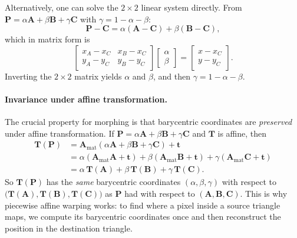 Alternatively, one can solve the $2\times2$ linear system directly.  From $\mathbf{P} = \alpha\mathbf{A} + \beta\mathbf{B} + \gamma\mathbf{C}$ with $\gamma = 1 - \alpha - \beta$:
\[
    \mathbf{P} - \mathbf{C} = \alpha(\mathbf{A} - \mathbf{C}) + \beta(\mathbf{B} - \mathbf{C}),
\]
which in matrix form is
\[
    \begin{bmatrix}
        x_A - x_C & x_B - x_C \\
        y_A - y_C & y_B - y_C
    \end{bmatrix}
    \begin{bmatrix} \alpha \\ \beta \end{bmatrix}
    =
    \begin{bmatrix} x - x_C \\ y - y_C \end{bmatrix}.
\]
Inverting the $2\times2$ matrix yields $\alpha$ and $\beta$, and then $\gamma = 1 - \alpha - \beta$.

\paragraph{Invariance under affine transformation.}
The crucial property for morphing is that barycentric coordinates are \emph{preserved} under affine transformation.  If $\mathbf{P} = \alpha\mathbf{A} + \beta\mathbf{B} + \gamma\mathbf{C}$ and $\mathbf{T}$ is affine, then
\begin{align*}
    \mathbf{T}(\mathbf{P})
    &= \mathbf{A}_{\mathrm{mat}}(\alpha\mathbf{A} + \beta\mathbf{B} + \gamma\mathbf{C}) + \mathbf{t} \\
    &= \alpha(\mathbf{A}_{\mathrm{mat}}\mathbf{A} + \mathbf{t})
     + \beta(\mathbf{A}_{\mathrm{mat}}\mathbf{B} + \mathbf{t})
     + \gamma(\mathbf{A}_{\mathrm{mat}}\mathbf{C} + \mathbf{t}) \\
    &= \alpha\,\mathbf{T}(\mathbf{A}) + \beta\,\mathbf{T}(\mathbf{B}) + \gamma\,\mathbf{T}(\mathbf{C}).
\end{align*}
So $\mathbf{T}(\mathbf{P})$ has the \emph{same} barycentric coordinates $(\alpha, \beta, \gamma)$ with respect to $\bigl(\mathbf{T}(\mathbf{A}), \mathbf{T}(\mathbf{B}), \mathbf{T}(\mathbf{C})\bigr)$ as $\mathbf{P}$ had with respect to $(\mathbf{A}, \mathbf{B}, \mathbf{C})$.  This is why piecewise affine warping works: to find where a pixel inside a source triangle maps, we compute its barycentric coordinates once and then reconstruct the position in the destination triangle.

